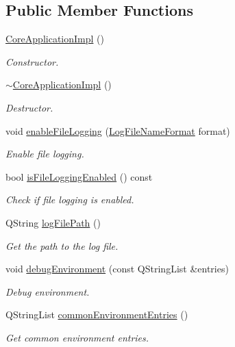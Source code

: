 \subsection*{Public Member Functions}
\begin{DoxyCompactItemize}
\item 
\hyperlink{class_mdt_1_1_core_application_impl_ab97b101b57a2fa8410e39b940e022c4c}{Core\+Application\+Impl} ()
\begin{DoxyCompactList}\small\item\em Constructor. \end{DoxyCompactList}\item 
\hyperlink{class_mdt_1_1_core_application_impl_aa17f799e5d756ca8c5a89196fcbd8e90}{$\sim$\+Core\+Application\+Impl} ()
\begin{DoxyCompactList}\small\item\em Destructor. \end{DoxyCompactList}\item 
void \hyperlink{class_mdt_1_1_core_application_impl_a3bd40afeeb08ddcba8cbfc78c177305b}{enable\+File\+Logging} (\hyperlink{class_mdt_1_1_core_application_impl_aa5fed8435e22870a870005ee28ff6221}{Log\+File\+Name\+Format} format)
\begin{DoxyCompactList}\small\item\em Enable file logging. \end{DoxyCompactList}\item 
bool \hyperlink{class_mdt_1_1_core_application_impl_a42a42b5d134b70a6e1c0452f29c73912}{is\+File\+Logging\+Enabled} () const 
\begin{DoxyCompactList}\small\item\em Check if file logging is enabled. \end{DoxyCompactList}\item 
Q\+String \hyperlink{class_mdt_1_1_core_application_impl_abc2b6b3ab83fdf2fd9dca1447bc82418}{log\+File\+Path} ()
\begin{DoxyCompactList}\small\item\em Get the path to the log file. \end{DoxyCompactList}\item 
void \hyperlink{class_mdt_1_1_core_application_impl_a29a336750c7ea04a570fbd769497c98f}{debug\+Environment} (const Q\+String\+List \&entries)
\begin{DoxyCompactList}\small\item\em Debug environment. \end{DoxyCompactList}\item 
Q\+String\+List \hyperlink{class_mdt_1_1_core_application_impl_abbafc463e7c820e42f967813e9e7ae7a}{common\+Environment\+Entries} ()
\begin{DoxyCompactList}\small\item\em Get common environment entries. \end{DoxyCompactList}\end{DoxyCompactItemize}
